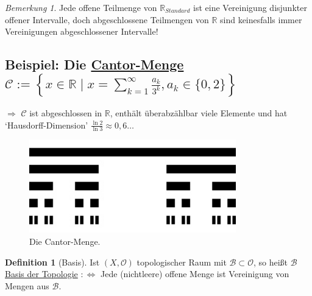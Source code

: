 \documentclass[a4paper,11pt,notitlepage]{report}
\theoremstyle{remark}
\newtheorem{remark}{Bemerkung}[chapter]
\theoremstyle{definition}
\newtheorem{definition}{Definition}[chapter]
\newcommand{\R}{{\ensuremath{\mathbb{R}}}}
\newcommand{\OO}{{\ensuremath{\mathcal{O}}}}
\newenvironment{bsp}[1]
{
\setlength{\fboxsep}{10pt}
\subsection*{Beispiel: #1}
\begin{upshape}
}
{
\end{upshape}
}
\begin{document}
\begin{remark}
	Jede offene Teilmenge von $\R_{Standard}$ ist eine Vereinigung disjunkter offener Intervalle, doch abgeschlossene Teilmengen von $\R$ sind keinesfalls immer Vereinigungen abgeschlossener Intervalle!
\end{remark}

\begin{bsp}{Die \underline{Cantor-Menge} $\mathcal{C}:= \left \{ x \in \R \mid x = \sum\limits_{k=1}^{\infty}{\frac{a_k}{3^k}}, a_k \in \{0,2\} \right \}$}
	$\Rightarrow$ $\mathcal{C}$ ist abgeschlossen in $\R$, enthält überabzählbar viele Elemente und hat `Hausdorff-Dimension' $\frac{\ln 2}{\ln 3} \approx 0,6 \ldots$
\end{bsp}

\begin{figure}[h]
\centering
\includegraphics[width=0.8\textwidth]{images/Cantormenge_5te_Iteration.jpg}
\caption{Die Cantor-Menge.}
\end{figure}

\begin{definition}[Basis]
	Ist $(X, \OO)$ topologischer Raum mit $\mathcal{B} \subset \OO$, 
	\newline
	so heißt $\mathcal{B}$ \underline{Basis der Topologie} $:\Leftrightarrow$ Jede (nichtleere) offene Menge ist Vereinigung von Mengen aus $\mathcal{B}$.
\end{definition}
\end{document}
